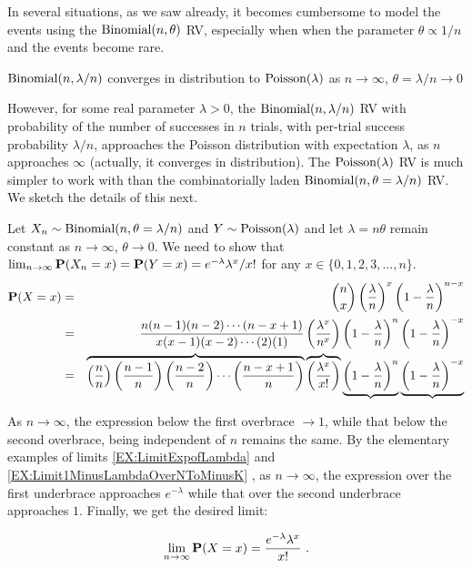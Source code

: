 \begin{example}\label{EgBinomialConvergesInDistToPoisson}
In several situations, as we saw already, it becomes cumbersome to model the events using the $\mbox{{\rm Binomial}}(n,\theta)$ RV, especially when when the parameter $\theta \propto 1/n$ and the events become rare.  

\begin{center}
\begin{frame}
{$\mbox{{\rm Binomial}}(n,\lambda/n)$ converges in distribution to $\mbox{{\rm Poisson}}(\lambda)$ as $n \to \infty$, $\theta=\lambda/n \to 0$}
\end{frame}
\end{center}

However, for some real parameter $\lambda>0$, the $\mbox{{\rm Binomial}}(n,\lambda/n)$ RV with probability of the number of successes in $n$ trials, with per-trial success probability $\lambda/n$, approaches the Poisson distribution with expectation $\lambda$, as $n$ approaches $\infty$ (actually, it converges in distribution).  
The $\mbox{{\rm Poisson}}(\lambda)$ RV is much simpler to work with than the combinatorially laden $\mbox{{\rm Binomial}}(n,\theta=\lambda/n)$ RV.  We sketch the details of this next.

Let $X_n \sim \mbox{{\rm Binomial}}(n,\theta=\lambda/n)$ and $Y \sim \mbox{{\rm Poisson}}(\lambda)$ and let $\lambda=n\theta$ remain constant as  $n \to \infty$, $\theta \to 0$.  
We need to show that $\lim_{n \to \infty} \mathbf{P}(X_n=x) = \mathbf{P}(Y=x) = e^{-\lambda}\lambda^x/x!$ for any $x \in \{0,1,2,3,\ldots,n\}$. 
\begin{eqnarray}
\mathbf{P}(X=x)
&=&
\binom{n}{x} \left( \frac{\lambda}{n} \right)^x \left( 1- \frac{\lambda}{n} \right)^{n-x} \notag \\
&=& \frac{n(n-1)(n-2)\cdots(n-x+1)}{x(x-1)(x-2)\cdots (2)(1)}
\left( \frac{\lambda^x}{n^x} \right)
\left( 1- \frac{\lambda}{n} \right)^n
\left( 1- \frac{\lambda}{n} \right)^{-x} \notag \\
&=&
\overbrace{\left( \frac{n}{n} \right) \left( \frac{n-1}{n} \right) \left( \frac{n-2}{n} \right) \cdots \left( \frac{n-x+1}{n} \right)}
\overbrace{\left( \frac{\lambda^x}{x!} \right)}
\underbrace{\left( 1- \frac{\lambda}{n} \right)^n}
\underbrace{\left( 1- \frac{\lambda}{n} \right)^{-x}}  \notag \\
\end{eqnarray}

As $n \to \infty$, the expression below the first overbrace $\to 1$, while that below the second overbrace, being independent of $n$ remains the same.  By the elementary examples of limits
\ref*{EX:LimitExpofLambda} and \ref*{EX:Limit1MinusLambdaOverNToMinusK}%
, as $n \to \infty$, the expression over the first underbrace approaches $e^{-\lambda}$ while that over the second underbrace approaches $1$.  Finally, we get the desired limit:

\[
\lim_{n \to \infty} \mathbf{P}(X=x)
= \frac{ e^{-\lambda} \lambda^x}{x!}  \ .
\]
\end{example}

